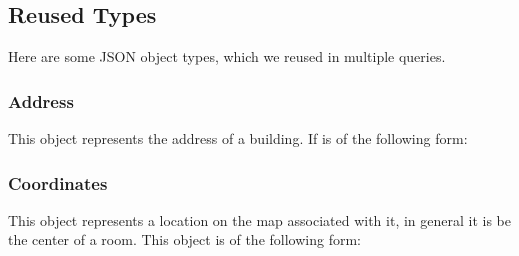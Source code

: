 \subsection{Reused Types}
Here are some JSON object types, which we reused in multiple queries.

\subsubsection{Address}
\label{net:address}
This object represents the address of a building. If is of the following form:
\begin{description}
\end{description}

\subsubsection{Coordinates}
\label{net:coords}
This object represents a location on the map associated with it, in general it is be the center of a room. This object is of the following form:
\begin{description}
\end{description}
